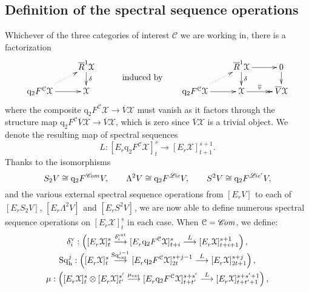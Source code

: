 \documentclass[11pt]{amsart} \renewcommand{\baselinestretch}{1.2}
\theoremstyle{plain}
\numberwithin{equation}{section} %
\theoremstyle{plain}
\numberwithin{equation}{chapter} %
\renewcommand{\to}{\longrightarrow}
\newcommand{\scrL}{\mathscr{L}}
\newcommand{\scrC}{\mathscr{C}}
\newcommand{\frakt}{\mathfrak{t}}
\newcommand{\fraks}{\mathfrak{s}}
\newcommand{\calx}{\mathcal{X}}
\newcommand{\calc}{\mathcal{C}}
\newcommand{\quadgrad}[1]{\mathrm{q}_{#1}}
\newcommand{\Sq}{\mathrm{Sq}}
\newcommand{\algs}{{\scrC\!\textit{\normalfont\textit{om}}}}
\newcommand{\liealgs}{{\scrL\!\textit{ie}}}
\newcommand{\restliealgs}{{\scrL\!\textit{ie}^\textit{r}}}
\newcommand{\E}[5]{[E^{#1}_{#2}#3]^{#4}_{#5}}
\newcommand{\Edownup}[5]{[E_{#1}^{#2}#3]^{#4}_{#5}}
\newcommand{\uver}{^\mathrm{v}}
\newcommand{\dhor}{_\mathrm{h}}
\newcommand{\Sqh}{\mathrm{Sq}\dhor}
\newcommand{\deltav}{\delta\uver}
\newcommand{\Dendo}{R}
\newcommand{\SubsectionOrSection}[1]{\subsection{#1}}
\begin{document}
\begin{Operations on the Bousfield-Kan spectral sequence}
%
\SubsectionOrSection{Definition of the spectral sequence operations}
\label{Definition of the spectral sequence operations}
Whichever of the three categories of interest $\calc$ we are working in, there is a factorization
\[\vcenter{\xymatrix@R=4mm{
&%
\overline{\Dendo}^1\calx\ar[d]^-{\delta}
\\%
\quadgrad{2}F^{\calc}\calx\ar@{..>}[ur]
\ar[r]
&%
\calx%
}}
\textup{\qquad\quad induced by\qquad}
\vcenter{\xymatrix@R=4mm{
&\overline{\Dendo}^1\calx \ar[r]
\ar[d]^-{\delta}
&%
0\ar[d]\\
\quadgrad{2}F^{\calc}\calx\ar@{..>}[ur]
\ar[r]
&
\calx \ar@{->>}[r]^-{\overline{v}}
&%
\overline{V}\calx %
}}\]
where the composite $\quadgrad{2}F^{\calc}\calx\to \overline{V}\calx $ must vanish as it factors through the structure map $\quadgrad{2}F^{\calc}\overline{V}\calx\to \overline{V}\calx $, which is zero since $\overline{V}\calx$ is a  trivial object. We denote the resulting map of spectral sequences
\[L:\Edownup{r}{}{\quadgrad{2}F^{\calc}\calx}{s}{t}\to \Edownup{r}{}{\calx}{s+1}{t+1}.\]
Thanks to the isomorphisms
\[S_2V\cong \quadgrad{2}F^{\algs}V,\qquad \Lambda^2V\cong \quadgrad{2}F^{\liealgs}V,\qquad S^2V\cong \quadgrad{2}F^{\restliealgs}V,\]
and the various external spectral sequence operations from $\E{}{r}{V}{}{}$ to each of $\E{}{r}{S_2V}{}{}$, $\E{}{r}{\Lambda^2V}{}{}$ and $\E{}{r}{S^2V}{}{}$, we are now able to define numerous spectral sequence operations on $\Edownup{r}{}{\calx}{s}{t}$ in each case. When $\calc=\algs$, we define:
\begin{gather*}
\deltav_i:\left(\Edownup{r}{}{\calx}{s}{t} \smash{{}\overset{\delta_i^\textup{ext}}{\to}{}} \Edownup{r}{}{\quadgrad{2}F^\calc \calx}{s}{t+i}\overset{L}{\to} 
\Edownup{r}{}{\calx}{s+1}{t+i+1}\right),
\\
\Sqh^j:\left(\Edownup{r}{}{\calx}{s}{t}   \smash{{}\overset{\Sq^{j-1}_\textup{ext}}{\to}{}} \Edownup{r}{}{\quadgrad{2}F^\calc \calx}{s+j-1}{2t}\overset{L}{\to} 
\Edownup{r}{}{\calx}{s+j}{2t+1}\right),\\
\mu:\left(\Edownup{r}{}{\calx}{s}{t}\otimes \Edownup{r}{}{\calx}{s'}{t'}\smash{{}\overset{\mu_\textup{ext}}{\to}{}} \Edownup{r}{}{\quadgrad{2}F^\calc \calx}{s+s'}{t+t'}\overset{L}{\to} 
\Edownup{r}{}{\calx}{s+s'+1}{t+t'+1}\right),

\end{gather*}
\end{Operations on the Bousfield-Kan spectral sequence}
\end{document}
